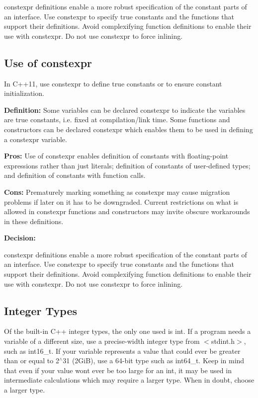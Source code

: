 {\ttfamily constexpr} definitions enable a more robust specification of the constant parts of an interface. Use {\ttfamily constexpr} to specify true constants and the functions that support their definitions. Avoid complexifying function definitions to enable their use with constexpr. Do not use constexpr to force inlining.

\subsection*{Use of constexpr}

In C++11, use {\ttfamily constexpr} to define true constants or to ensure constant initialization.

{\bfseries Definition\+:} Some variables can be declared constexpr to indicate the variables are true constants, i.\+e. fixed at compilation/link time. Some functions and constructors can be declared constexpr which enables them to be used in defining a constexpr variable.

{\bfseries Pros\+:} Use of constexpr enables definition of constants with floating-\/point expressions rather than just literals; definition of constants of user-\/defined types; and definition of constants with function calls.

{\bfseries Cons\+:} Prematurely marking something as {\ttfamily constexpr} may cause migration problems if later on it has to be downgraded. Current restrictions on what is allowed in constexpr functions and constructors may invite obscure workarounds in these definitions.

{\bfseries Decision\+:}

{\ttfamily constexpr} definitions enable a more robust specification of the constant parts of an interface. Use constexpr to specify true constants and the functions that support their definitions. Avoid complexifying function definitions to enable their use with constexpr. Do not use constexpr to force inlining.

\subsection*{Integer Types}

Of the built-\/in C++ integer types, the only one used is {\ttfamily int}. If a program needs a variable of a different size, use a precise-\/width integer type from {\ttfamily $<$stdint.\+h$>$}, such as {\ttfamily int16\+\_\+t}. If your variable represents a value that could ever be greater than or equal to 2$^\wedge$31 (2\+GiB), use a 64-\/bit type such as {\ttfamily int64\+\_\+t}. Keep in mind that even if your value won\textquotesingle{}t ever be too large for an {\ttfamily int}, it may be used in intermediate calculations which may require a larger type. When in doubt, choose a larger type.

